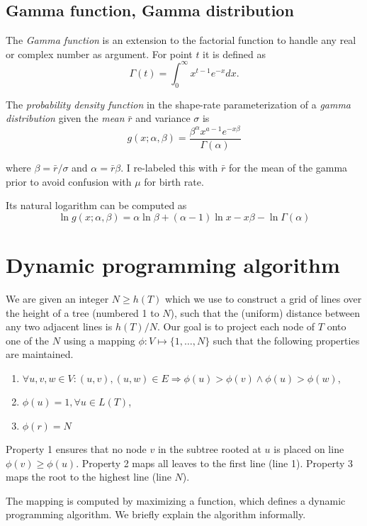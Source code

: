 \documentclass{llncs}
\newcommand{\ejmcomment}[1]{{\color{green} #1}}
\begin{document}
\subsection{Gamma function, Gamma distribution}

The {\em Gamma function} is an extension to the factorial function to handle
any real or complex number as argument. For point $t$ it is defined as
$$\Gamma(t) = \int_0^\infty x^{t-1} e^{-x} dx.$$

The {\em probability density function} in the shape-rate parameterization of a
{\em gamma distribution} given the {\em mean} $\bar{r}$ and variance $\sigma$ is
$$ g(x;\alpha,\beta) = \frac{\beta^{\alpha}x^{a-1}e^{-x\beta}}{\Gamma(\alpha)} $$

where $\beta = \bar{r} / \sigma$ and $\alpha = \bar{r} \beta$.
\ejmcomment{I re-labeled this with $\bar{r}$ for the mean of the gamma prior to avoid confusion with $\mu$ for birth rate.}

Its natural logarithm can be computed as
$$ \ln g(x;\alpha,\beta) = \alpha\ln\beta + (\alpha-1)\ln x -x\beta - \ln\Gamma(\alpha) $$

\section{Dynamic programming algorithm}

We are given an integer $N \geq h(T)$ which we use to construct a grid of lines
over the height of a tree (numbered 1 to $N$), such that the (uniform) distance between any two
adjacent lines is $h(T) / N$.  Our goal is to project each node of $T$ onto one
of the $N$ using a mapping $\phi : V \mapsto \{1,\ldots,N\}$ such that the
following properties are maintained.
\begin{enumerate}
\item $\forall u,v,w \in V : (u,v), (u,w) \in E \Rightarrow \phi(u) > \phi(v) \wedge \phi(u) > \phi(w)$,
\item $\phi(u) = 1, \forall u \in L(T)$,
\item $\phi(r) = N$
\end{enumerate}

Property 1 ensures that no node $v$ in the subtree rooted at $u$ is placed on
line $\phi(v) \geq \phi(u)$. Property 2 maps all leaves to the first line (line 1).
Property 3 maps the root to the highest line (line $N$).

The mapping is computed by maximizing a function, which defines a
dynamic programming algorithm.  We briefly explain the algorithm informally.
\end{document}
